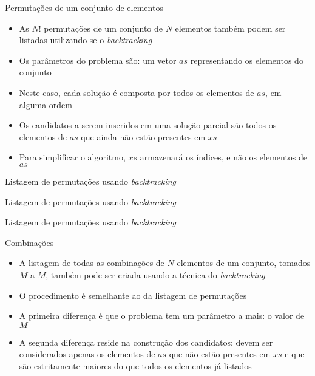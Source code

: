 \begin{frame}[fragile]{Permutações de um conjunto de elementos}

    \begin{itemize}
        \item As $N!$ permutações de um conjunto de $N$ elementos também podem ser
            listadas utilizando-se o \textit{backtracking}

        \item Os parâmetros do problema são: um vetor $as$ representando os elementos do
            conjunto

        \item Neste caso, cada solução é composta por todos os elementos de $as$, em alguma ordem

        \item Os candidatos a serem inseridos em uma solução parcial são todos os elementos de
            $as$ que ainda não estão presentes em $xs$

        \item Para simplificar o algoritmo, $xs$ armazenará os índices, e não os elementos de
            $as$
    \end{itemize}

\end{frame}

\begin{frame}[fragile]{Listagem de permutações usando {\it backtracking}}
\end{frame}

\begin{frame}[fragile]{Listagem de permutações usando {\it backtracking}}
\end{frame}

\begin{frame}[fragile]{Listagem de permutações usando {\it backtracking}}
\end{frame}

\begin{frame}[fragile]{Combinações}

    \begin{itemize}
        \item A listagem de todas as combinações de $N$ elementos de um conjunto, tomados
            $M$ a $M$, também pode ser criada usando a técnica do \textit{backtracking}

        \item O procedimento é semelhante ao da listagem de permutações

        \item A primeira diferença é que o problema tem um parâmetro a mais: o valor de $M$

        \item A segunda diferença reside na construção dos candidatos: devem ser considerados
            apenas os elementos de $as$ que não estão presentes em $xs$ e que são estritamente
            maiores do que todos os elementos já listados
    \end{itemize}

\end{frame}

